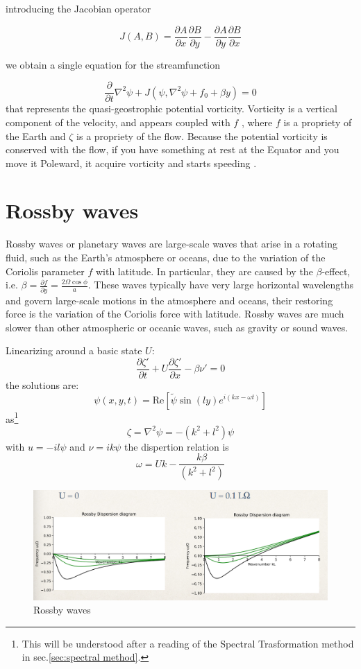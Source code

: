 introducing the Jacobian operator

\[J(A,B) = \frac{\partial A}{\partial x}\frac{\partial B}{\partial y} - \frac{\partial A}{\partial y}\frac{\partial B}{\partial x}\]

we obtain a single equation for the streamfunction

\[\frac{\partial }{\partial t}\nabla^2\psi  + J(\psi, \nabla^2\psi +f_0 + \beta y) = 0\]
that represents the quasi-geostrophic potential vorticity.
Vorticity is a vertical component of the velocity, and appears coupled with $f$ , where $f$ is a propriety of the Earth and $\zeta$  is a propriety of the flow. Because the potential vorticity is conserved with the flow, if you have something at rest at the Equator and you move it Poleward, it acquire vorticity and starts speeding .


\section{Rossby waves}
Rossby waves or planetary waves are large-scale waves that arise in a rotating fluid, such as the Earth's atmosphere or oceans, due to the variation of the Coriolis parameter $f$ with latitude. In particular, they are caused by the $\beta$-effect, i.e. $\beta=\frac{\partial f}{\partial y}=\frac{2\Omega\cos\phi}{a}$. These waves typically have very large horizontal wavelengths and govern large-scale motions in the atmosphere and oceans, their restoring force is the variation of the Coriolis force with latitude. Rossby waves are much slower than other atmospheric or oceanic waves, such as gravity or sound waves.

Linearizing around a basic state $U$: 
\begin{equation}
    \frac{\partial\zeta'}{\partial t}+U\frac{\partial\zeta'}{\partial x}-\beta\nu'=0
\end{equation}
the solutions are: 
\begin{equation}
    \psi(x,y,t)=\text{Re}\left[\tilde{\psi}\sin(ly)e^{i(kx-\omega t)}\right]
\end{equation}
as\footnote{This will be understood after a reading of the Spectral Trasformation method in sec.\ref{sec:spectral method}.} $$\zeta=\nabla^2\psi=-(k^2+l^2)\psi$$
with $u=-il\psi$ and $\nu=ik\psi$
the dispertion relation is $$\omega=Uk-\frac{k\beta}{(k^2+l^2)}$$
\begin{figure}[htpb]
    \centering
    \includegraphics[width=0.5\linewidth]{uploads/Screenshot 2024-11-21 162828.png}
    \caption{Rossby waves}
    \label{fig:ross waves}
\end{figure}

